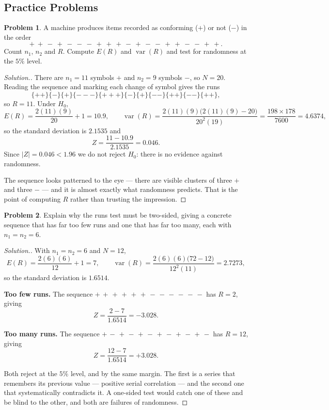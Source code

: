 \documentclass[11pt,a4paper]{article}
\theoremstyle{definition}
\newtheorem{problemx}{Problem}[section]
\newenvironment{problem}{\begin{problemx}}{\end{problemx}}
\newenvironment{solution}
  {\renewcommand{\qedsymbol}{}\begin{proof}[\textit{Solution}.]}
  {\end{proof}}
\begin{document}
\subsection{Practice Problems}

\begin{problem}
A machine produces items recorded as conforming ($+$) or not ($-$) in the order
$$+\ +\ -\ +\ -\ -\ -\ +\ +\ +\ -\ +\ -\ -\ +\ +\ -\ -\ +\ + .$$
Count $n_1$, $n_2$ and $R$. Compute $E(R)$ and $\operatorname{var}(R)$ and test
for randomness at the $5\%$ level.
\end{problem}

\begin{solution}
There are $n_1 = 11$ symbols $+$ and $n_2 = 9$ symbols $-$, so $N = 20$. Reading
the sequence and marking each change of symbol gives the runs
$$\{++\}\{-\}\{+\}\{---\}\{+++\}\{-\}\{+\}\{--\}\{++\}\{--\}\{++\},$$
so $R = 11$. Under $H_0$,
$$E(R) = \dfrac{2(11)(9)}{20} + 1 = 10.9,\qquad
\operatorname{var}(R) = \dfrac{2(11)(9)\big(2(11)(9) - 20\big)}{20^{2}(19)}
= \dfrac{198 \times 178}{7600} = 4.6374,$$
so the standard deviation is $2.1535$ and
$$Z = \dfrac{11 - 10.9}{2.1535} = 0.046 .$$
Since $\left|Z\right| = 0.046 < 1.96$ we do not reject $H_0$: there is no evidence
against randomness.

The sequence looks patterned to the eye --- there are visible clusters of three
$+$ and three $-$ --- and it is almost exactly what randomness predicts. That is
the point of computing $R$ rather than trusting the impression.
\end{solution}


\begin{problem}
Explain why the runs test must be two-sided, giving a concrete sequence that has
far too few runs and one that has far too many, each with $n_1 = n_2 = 6$.
\end{problem}

\begin{solution}
With $n_1 = n_2 = 6$ and $N = 12$,
$$E(R) = \dfrac{2(6)(6)}{12} + 1 = 7,\qquad
\operatorname{var}(R) = \dfrac{2(6)(6)\big(72 - 12\big)}{12^{2}(11)} = 2.7273,$$
so the standard deviation is $1.6514$.

\textbf{Too few runs.} The sequence $+\,+\,+\,+\,+\,+\,-\,-\,-\,-\,-\,-$ has
$R = 2$, giving
$$Z = \dfrac{2 - 7}{1.6514} = -3.028 .$$

\textbf{Too many runs.} The sequence $+\,-\,+\,-\,+\,-\,+\,-\,+\,-\,+\,-$ has
$R = 12$, giving
$$Z = \dfrac{12 - 7}{1.6514} = +3.028 .$$

Both reject at the $5\%$ level, and by the same margin. The first is a series that
remembers its previous value --- positive serial correlation --- and the second one
that systematically contradicts it. A one-sided test would catch one of these
and be blind to the other, and both are failures of randomness.
\end{solution}
\end{document}
